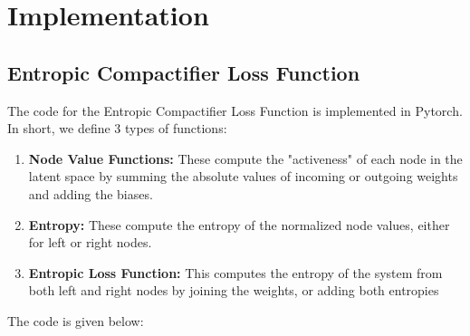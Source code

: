 \documentclass[12pt]{article}
\begin{document}
\section{Implementation}
\subsection{Entropic Compactifier Loss Function}
The code for the Entropic Compactifier Loss Function is implemented in Pytorch. In short, we define 3 types of functions:
\begin{enumerate}
    \item \textbf{Node Value Functions:} These compute the "activeness" of each node in the latent space by summing the absolute values of incoming or outgoing weights and adding the biases.
    \item \textbf{Entropy:} These compute the entropy of the normalized node values, either for left or right nodes.
    \item \textbf{Entropic Loss Function:} This computes the entropy of the system from both left and right nodes by joining the weights, or adding both entropies
\end{enumerate}

The code is given below:

\break
\end{document}
